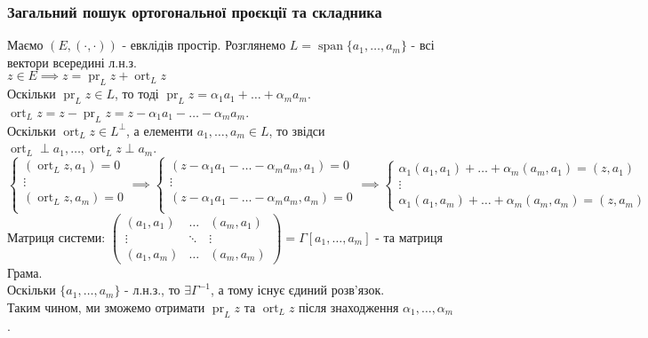 \documentclass[a4paper, 10pt]{article}
\theoremstyle{theoremdd}
\DeclareMathOperator{\linspan}{span}
\DeclareMathOperator{\ort}{ort}
\DeclareMathOperator{\pr}{pr}
\begin{document}
\subsubsection*{Загальний пошук ортогональної проєкції та складника}
Маємо $(E,(\cdot, \cdot))$ - евклідів простір. Розглянемо $L = \linspan\{a_1,\dots,a_m\}$ - всі вектори всередині л.н.з.\\
$z \in E \implies z = \pr_L z + \ort_L z$\\
Оскільки $\pr_L z \in L$, то тоді $\pr_L z = \alpha_1 a_1 + \dots + \alpha_m a_m$.\\
$\ort_L z = z - \pr_L z = \displaystyle z - \alpha_1 a_1 - \dots - \alpha_m a_m$.\\
Оскільки $\ort_L z \in L^\perp$, а елементи $a_1,\dots,a_m \in L$, то звідси $\ort_L \perp a_1, \dots, \ort_L z \perp a_m$.\\
$\begin{cases}
(\ort_L z, a_1) = 0 \\
\vdots \\
(\ort_L z, a_m) = 0 \\
\end{cases} \implies
\begin{cases}
(\displaystyle z - \alpha_1 a_1 - \dots - \alpha_m a_m, a_1) = 0 \\
\vdots \\
(\displaystyle z - \alpha_1 a_1 - \dots - \alpha_m a_m,a_m) = 0 \\
\end{cases} \implies
\begin{cases}
\alpha_1 (a_1,a_1) + \dots + \alpha_m (a_m,a_1) = (z,a_1) \\
\vdots \\
\alpha_1 (a_1,a_m) + \dots + \alpha_m (a_m,a_m) = (z,a_m)
\end{cases}
$\\
Матриця системи: $\begin{pmatrix}
 (a_1,a_1) & \dots & (a_m,a_1) \\
 \vdots & \ddots & \vdots \\
 (a_1,a_m) & \dots & (a_m,a_m)
\end{pmatrix} = \Gamma[a_1,\dots,a_m]$ - та матриця Грама.\\
Оскільки $\{a_1,\dots,a_m\}$ - л.н.з., то $\exists \Gamma^{-1}$, а тому існує єдиний розв'язок.\\
Таким чином, ми зможемо отримати $\pr_L z$ та $\ort_L z$ після знаходження $\alpha_1,\dots,\alpha_m$.
\end{document}
